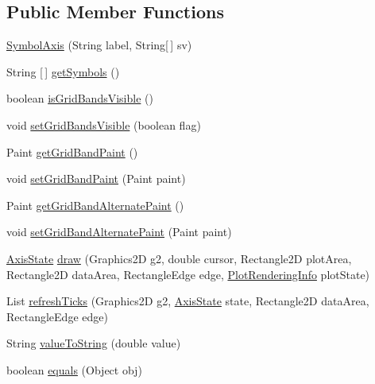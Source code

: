 \subsection*{Public Member Functions}
\begin{DoxyCompactItemize}
\item 
\mbox{\hyperlink{classorg_1_1jfree_1_1chart_1_1axis_1_1_symbol_axis_aa462a9c4532d3de2ffa0bf0e7f32c34d}{Symbol\+Axis}} (String label, String\mbox{[}$\,$\mbox{]} sv)
\item 
String \mbox{[}$\,$\mbox{]} \mbox{\hyperlink{classorg_1_1jfree_1_1chart_1_1axis_1_1_symbol_axis_a752482c415cc78ad2d0296a32d57f9e4}{get\+Symbols}} ()
\item 
boolean \mbox{\hyperlink{classorg_1_1jfree_1_1chart_1_1axis_1_1_symbol_axis_a0201bb1eb987ff0fccdb1ed6401f6546}{is\+Grid\+Bands\+Visible}} ()
\item 
void \mbox{\hyperlink{classorg_1_1jfree_1_1chart_1_1axis_1_1_symbol_axis_a318debeb1189f1186c072082270d3d09}{set\+Grid\+Bands\+Visible}} (boolean flag)
\item 
Paint \mbox{\hyperlink{classorg_1_1jfree_1_1chart_1_1axis_1_1_symbol_axis_a180cbfcf9840f685400f6658e4fc29dc}{get\+Grid\+Band\+Paint}} ()
\item 
void \mbox{\hyperlink{classorg_1_1jfree_1_1chart_1_1axis_1_1_symbol_axis_af856b13e59d84b2df9ff838b0363a6d3}{set\+Grid\+Band\+Paint}} (Paint paint)
\item 
Paint \mbox{\hyperlink{classorg_1_1jfree_1_1chart_1_1axis_1_1_symbol_axis_ab4690b0b0c3e3710d1a50a4ee950e40e}{get\+Grid\+Band\+Alternate\+Paint}} ()
\item 
void \mbox{\hyperlink{classorg_1_1jfree_1_1chart_1_1axis_1_1_symbol_axis_a96e22d7f20188af44d5fcd5b1de1d204}{set\+Grid\+Band\+Alternate\+Paint}} (Paint paint)
\item 
\mbox{\hyperlink{classorg_1_1jfree_1_1chart_1_1axis_1_1_axis_state}{Axis\+State}} \mbox{\hyperlink{classorg_1_1jfree_1_1chart_1_1axis_1_1_symbol_axis_abd3d542d3230dc9ca14827208c9e8df5}{draw}} (Graphics2D g2, double cursor, Rectangle2D plot\+Area, Rectangle2D data\+Area, Rectangle\+Edge edge, \mbox{\hyperlink{classorg_1_1jfree_1_1chart_1_1plot_1_1_plot_rendering_info}{Plot\+Rendering\+Info}} plot\+State)
\item 
List \mbox{\hyperlink{classorg_1_1jfree_1_1chart_1_1axis_1_1_symbol_axis_a7c9f00b02c1c1af66fd2d3cfb453a115}{refresh\+Ticks}} (Graphics2D g2, \mbox{\hyperlink{classorg_1_1jfree_1_1chart_1_1axis_1_1_axis_state}{Axis\+State}} state, Rectangle2D data\+Area, Rectangle\+Edge edge)
\item 
String \mbox{\hyperlink{classorg_1_1jfree_1_1chart_1_1axis_1_1_symbol_axis_a43a6ecf2b167e2d71036ad4cb7d5b8b3}{value\+To\+String}} (double value)
\item 
boolean \mbox{\hyperlink{classorg_1_1jfree_1_1chart_1_1axis_1_1_symbol_axis_a631dd4edd09ef2b7c5d4bd20f73598ba}{equals}} (Object obj)
\end{DoxyCompactItemize}
